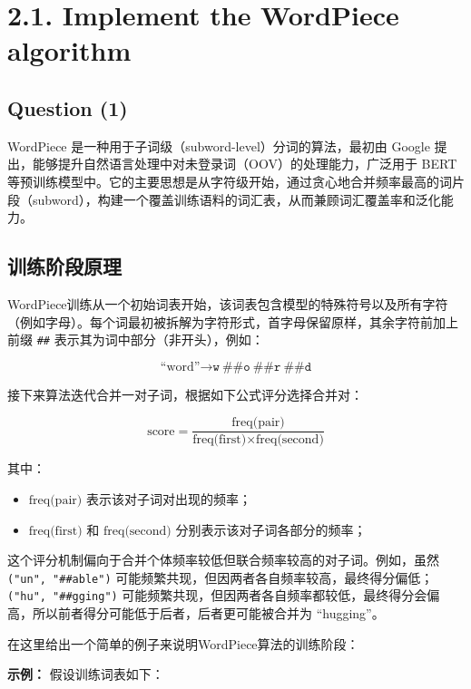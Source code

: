 \documentclass[12pt,letterpaper]{article}
\begin{document}
\section*{2.1. Implement the WordPiece algorithm}

\subsection*{Question (1)}

WordPiece 是一种用于子词级（subword-level）分词的算法，最初由 Google 提出，能够提升自然语言处理中对未登录词（OOV）的处理能力，广泛用于 BERT 等预训练模型中。它的主要思想是从字符级开始，通过贪心地合并频率最高的词片段（subword），构建一个覆盖训练语料的词汇表，从而兼顾词汇覆盖率和泛化能力。

\subsection*{训练阶段原理}

WordPiece训练从一个初始词表开始，该词表包含模型的特殊符号以及所有字符（例如字母）。每个词最初被拆解为字符形式，首字母保留原样，其余字符前加上前缀 \texttt{\#\#} 表示其为词中部分（非开头），例如：

\[
\text{``word''} \rightarrow \texttt{w}\ \texttt{\#\#o}\ \texttt{\#\#r}\ \texttt{\#\#d}
\]

接下来算法迭代合并一对子词，根据如下公式评分选择合并对：

\[
\text{score} = \frac{\text{freq(pair)}}{\text{freq(first)} \times \text{freq(second)}}
\]

其中：
\begin{itemize}
	\item $\text{freq(pair)}$ 表示该对子词对出现的频率；
	\item $\text{freq(first)}$ 和 $\text{freq(second)}$ 分别表示该对子词各部分的频率；
\end{itemize}

这个评分机制偏向于合并个体频率较低但联合频率较高的对子词。例如，虽然 \texttt{("un", "\#\#able")} 可能频繁共现，但因两者各自频率较高，最终得分偏低； \texttt{("hu", "\#\#gging")} 可能频繁共现，但因两者各自频率都较低，最终得分会偏高，所以前者得分可能低于后者，后者更可能被合并为 “hugging”。

\vspace{1em}

在这里给出一个简单的例子来说明WordPiece算法的训练阶段：

\textbf{示例：} 假设训练词表如下：
\end{document}
